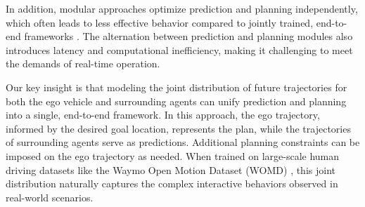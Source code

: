 
In addition, modular approaches optimize prediction and planning independently, which often leads to less effective behavior compared to jointly trained, end-to-end frameworks \cite{levine2016end}.
The alternation between prediction and planning modules also introduces latency and computational inefficiency, making it challenging to meet the demands of real-time operation.



Our key insight is that modeling the joint distribution of future trajectories for both the ego vehicle and surrounding agents can unify prediction and planning into a single, end-to-end framework. 
In this approach, the ego trajectory, informed by the desired goal location, represents the plan, while the trajectories of surrounding agents serve as predictions. 
Additional planning constraints can be imposed on the ego trajectory as needed. 
When trained on large-scale human driving datasets like the Waymo Open Motion Dataset (WOMD) \citep{ettinger2021large}, this joint distribution naturally captures the complex interactive behaviors observed in real-world scenarios.

